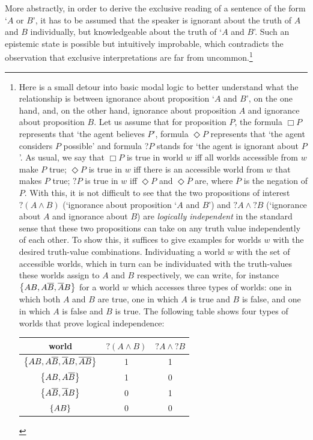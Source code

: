 \documentclass[12pt]{article}
\begin{document}
More abstractly, in order to derive the exclusive reading of a sentence of the form `$A$ or $B$', it has
to be assumed that the speaker is ignorant about the truth of $A$ and $B$ individually, but
knowledgeable about the truth of `$A$ and $B$'. Such an epistemic state is possible but
intuitively improbable, which contradicts the observation that exclusive interpretations are
far from uncommon.\footnote{Here is a small detour into basic modal logic to better understand
  what the relationship is between ignorance about
  proposition `$A$ and $B$', on the one hand, and, on the other hand, ignorance about
  proposition $A$ and ignorance about proposition $B$. Let us assume that for proposition $P$,
  the formula $\Box P$ represents that `the agent believes $P$', formula $\Diamond P$
  represents that `the agent considers $P$ possible' and formula ?$P$ stands for `the agent is
  ignorant about $P$'. As usual, we say that $\Box P$ is true in world $w$ iff all worlds
  accessible from $w$ make $P$ true; $\Diamond P$ is true in $w$ iff there is an accessible
  world from $w$ that makes $P$ true; $?P$ is true in $w$ iff $\Diamond P$ and $\Diamond
  \overline{P}$ are, where $\overline{P}$ is the negation of $P$. With this, it is not
  difficult to see that the two propositions of interest $?(A \wedge B)$ (`ignorance
  about proposition `$A$ and $B$') and $?A \wedge ?B$ (`ignorance about $A$ and ignorance about
  $B$) are \emph{logically independent} in the standard sense that these two propositions can
  take on any truth value independently of each other. To show this, it suffices to give
  examples for worlds $w$ with the desired truth-value combinations. Individuating a world $w$
  with the set of accessible worlds, which in turn can be individuated with the truth-values
  these worlds assign to $A$ and $B$ respectively, we can write, for instance $\left\{AB,
    A\overline{B}, \overline{A}B\right\}$ for a world $w$ which accesses three types of worlds: one in
which both $A$ and $B$ are true, one in which $A$ is true and $B$ is false, and one in which
$A$ is false and $B$ is true. The following table shows four types of worlds that prove logical
independence:
\begin{center}
  \begin{tabular}{ccc}
    world & $?(A \wedge B)$ & $?A \wedge ?B$ \\ \midrule 
    $\left\{AB, A\overline{B}, \overline{A}B, \overline{A}\overline{B}\right\}$ & 1 & 1\\
    $\left\{AB, A\overline{B}\right\}$ & 1 & 0 \\
    $\left\{A\overline{B}, \overline{A}B\right\}$ & 0 & 1 \\
    $\left\{AB\right\}$ & 0 & 0 \\
  \end{tabular}
\end{center}

}
\end{document}
